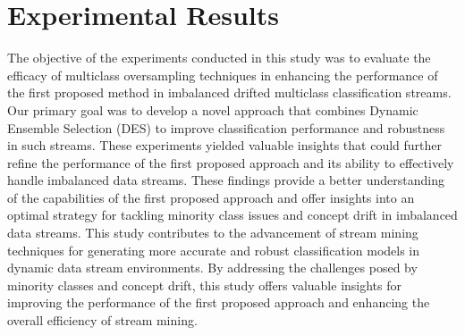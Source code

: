 %
%



\section{Experimental Results}
\label{sec:4_5_Expsetup}

The objective of the experiments conducted in this study was to evaluate the efficacy of multiclass oversampling techniques in enhancing the performance of the first proposed method in imbalanced drifted multiclass classification streams. Our primary goal was to develop a novel approach that combines Dynamic Ensemble Selection (DES) to improve classification performance and robustness in such streams. These experiments yielded valuable insights that could further refine the performance of the first proposed approach and its ability to effectively handle imbalanced data streams. These findings provide a better understanding of the capabilities of the first proposed approach and offer insights into an optimal strategy for tackling minority class issues and concept drift in imbalanced data streams. This study contributes to the advancement of stream mining techniques for generating more accurate and robust classification models in dynamic data stream environments. By addressing the challenges posed by minority classes and concept drift, this study offers valuable insights for improving the performance of the first proposed approach and enhancing the overall efficiency of stream mining.

